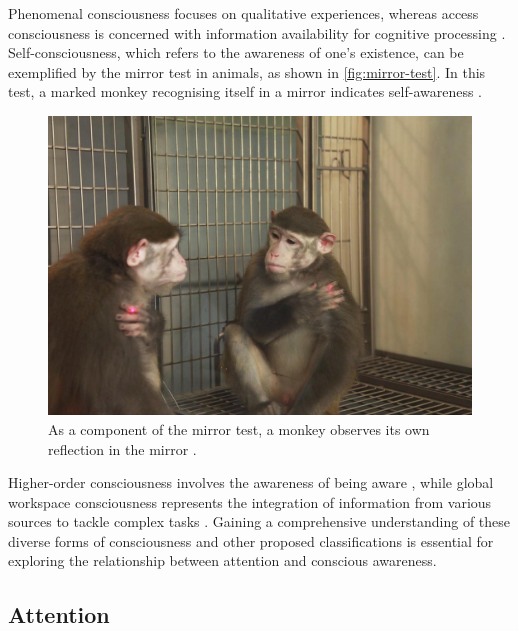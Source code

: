 \documentclass[10pt]{article}
\begin{document}
\begin{sloppypar}
  Phenomenal consciousness focuses on qualitative experiences, whereas access consciousness is concerned with information availability for cognitive processing \citep{aru_phenomenal_2013,de_brigard_role_2012}. Self-consciousness, which refers to the awareness of one’s existence, can be exemplified by the mirror test in animals, as shown in \autoref{fig:mirror-test}. In this test, a marked monkey recognising itself in a mirror indicates self-awareness \citep{chang_mirror-induced_2015}.

  \begin{figure}[ht]
    \centering
    \includegraphics[width=\textwidth]{figures/mirror.jpg}
    \caption[As a component of the mirror test, a monkey observes its own reflection in the mirror
    ]{As a component of the mirror test, a monkey observes its own reflection in the mirror \citep{chang_mirror-induced_2015}.}
    \label{fig:mirror-test}
  \end{figure}

  Higher-order consciousness involves the awareness of being aware \citep{carruthers_higher-order_2020}, while global workspace consciousness represents the integration of information from various sources to tackle complex tasks \citep{baars_essential_1997}. Gaining a comprehensive understanding of these diverse forms of consciousness and other proposed classifications is essential for exploring the relationship between attention and conscious awareness.

  \subsection{Attention}
  \label{sec:attention}


\end{sloppypar}
\end{document}
